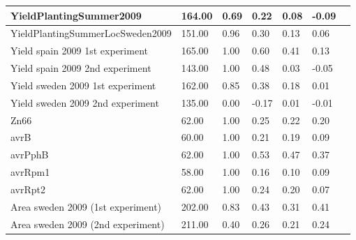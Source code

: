 \documentclass[ngerman,onecolumn,bibliography=totocnumbered]{scrreprt}
\begin{document}
\begin{table}[]
\begin{tabular}{|l|l|l|l|l|l|l|}
YieldPlantingSummer2009  & 164.00  & 0.69  & 0.22  & 0.08  & -0.09 \\ \hline
YieldPlantingSummerLocSweden2009  & 151.00  & 0.96  & 0.30  & 0.13  & 0.06 \\ \hline
Yield spain 2009 1st experiment  & 165.00  & 1.00  & 0.60  & 0.41  & 0.13 \\ \hline
Yield spain 2009 2nd experiment  & 143.00  & 1.00  & 0.48  & 0.03  & -0.05 \\ \hline
Yield sweden 2009 1st experiment  & 162.00  & 0.85  & 0.38  & 0.18  & 0.01 \\ \hline
Yield sweden 2009 2nd experiment  & 135.00  & 0.00  & -0.17  & 0.01  & -0.01 \\ \hline
Zn66  & 62.00  & 1.00  & 0.25  & 0.22  & 0.20 \\ \hline
avrB  & 60.00  & 1.00  & 0.21  & 0.19  & 0.09 \\ \hline
avrPphB  & 62.00  & 1.00  & 0.53  & 0.47  & 0.37 \\ \hline
avrRpm1  & 58.00  & 1.00  & 0.16  & 0.10  & 0.09 \\ \hline
avrRpt2  & 62.00  & 1.00  & 0.24  & 0.20  & 0.07 \\ \hline
Area sweden 2009 (1st experiment)  & 202.00  & 0.83  & 0.43  & 0.31  & 0.41 \\ \hline
Area sweden 2009 (2nd experiment)  & 211.00  & 0.40  & 0.26  & 0.21  & 0.24 \\ \hline
\end{tabular}
\end{table}
\end{document}
